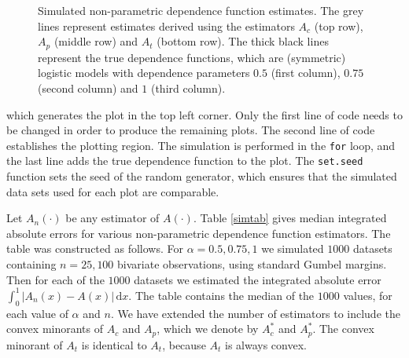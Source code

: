 \documentclass[11pt,a4paper]{article}
\begin{document}
\begin{figure}
\begin{center}
\vspace{-1.5cm}
\hspace{0cm}
\hspace{0cm}
\\
\vspace{-1.5cm}
\hspace{0cm}
\hspace{0cm}
\\
\vspace{-1.5cm}
\hspace{0cm}
\hspace{0cm}
\end{center} 
\caption{Simulated non-parametric dependence function estimates. The grey lines represent estimates derived using the estimators $A_c$ (top row), $A_p$ (middle row) and $A_t$ (bottom row). The thick black lines represent the true dependence functions, which are (symmetric) logistic models with dependence parameters $0.5$ (first column), $0.75$ (second column) and $1$ (third column).}
\label{simfig}
\end{figure}

which generates the plot in the top left corner.
Only the first line of code needs to be changed in order to produce the remaining plots.
The second line of code establishes the plotting region.
The simulation is performed in the \verb+for+ loop, and the last line adds the true dependence function to the plot.
The \verb+set.seed+ function sets the seed of the random generator, which ensures that the simulated data sets used for each plot are comparable.

Let $A_n(\cdot)$ be any estimator of $A(\cdot)$.
Table \ref{simtab} gives median integrated absolute errors for various non-parametric dependence function estimators.
The table was constructed as follows.
For $\alpha = 0.5,0.75,1$ we simulated $1000$ datasets containing $n=25,100$ bivariate observations, using standard Gumbel margins.
Then for each of the $1000$ datasets we estimated the integrated absolute error $\int_0^1|A_n(x) - A(x)| \, \text{d}x$. 
The table contains the median of the $1000$ values, for each value of $\alpha$ and $n$.
We have extended the number of estimators to include the convex minorants of $A_c$ and $A_p$, which we denote by $A_c^*$ and $A_p^*$.
The convex minorant of $A_t$ is identical to $A_t$, because $A_t$ is always convex.
\end{document}
